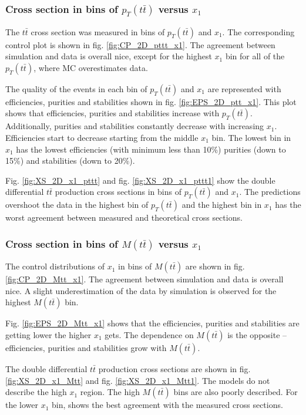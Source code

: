 \subsubsection{Cross section in bins of $p_{T}(t\bar{t})$ versus  $x_{1}$}

The $t\bar{t}$ cross section was measured in bins of $p_{T}(t\bar{t})$ and  $x_{1}$.
The corresponding control plot is shown in fig. \ref{fig:CP_2D_pttt_x1}. The agreement between simulation and data is overall nice, except for the highest
$x_{1}$ bin for all of the $p_{T}(t\bar{t})$, where MC overestimates data.

The quality of the events in each bin of $p_{T}(t\bar{t})$ and  $x_{1}$ are represented with efficiencies, purities and stabilities shown in fig. \ref{fig:EPS_2D_ptt_x1}.
This plot shows that efficiencies, purities and stabilities increase with $p_{T}(t\bar{t})$. Additionally, purities and stabilities constantly decrease with 
increasing  $x_{1}$. Efficiencies start to decrease starting from the middle $x_{1}$ bin. The lowest bin in  $x_{1}$ has the lowest efficiencies
(with minimum less than 10\%) purities (down to 15\%) and stabilities (down to 20\%).

Fig. \ref{fig:XS_2D_x1_pttt} and fig. \ref{fig:XS_2D_x1_pttt1} show the double differential $t\bar{t}$ production cross sections in bins of $p_{T}(t\bar{t})$ and $x_{1}$.
The predictions overshoot the data in the highest bin of $p_{T}(t\bar{t})$ and the highest bin in $x_{1}$ has the worst agreement between measured and theoretical
cross sections.

\subsubsection{Cross section in bins of $M(t\bar{t})$ versus  $x_{1}$}

The control distributions of $x_{1}$ in bins of $M(t\bar{t})$ are shown in fig. \ref{fig:CP_2D_Mtt_x1}. The agreement between simulation and data is overall nice.
A slight underestimation of the data by simulation is observed for the highest $M(t\bar{t})$ bin.

Fig. \ref{fig:EPS_2D_Mtt_x1} shows that the efficiencies, purities and stabilities are getting lower the higher $x_{1}$ gets. The dependence on $M(t\bar{t})$
is the opposite -- efficiencies, purities and stabilities grow with $M(t\bar{t})$.

The double differential $t\bar{t}$ production cross sections are shown in fig. \ref{fig:XS_2D_x1_Mtt} and fig. \ref{fig:XS_2D_x1_Mtt1}. The models do not describe the high $x_{1}$ region. The 
high $M(t\bar{t})$ bins are also poorly described. For the lower $x_{1}$ bin, \MG shows the best agreement with the measured cross sections.


